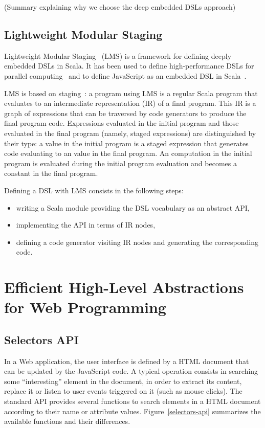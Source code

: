 \documentclass[preprint]{sigplanconf}
\begin{document}
(Summary explaining why we choose the deep embedded DSLs approach)

\subsection{Lightweight Modular Staging}

Lightweight Modular Staging~\cite{Rompf12_LMSThesis, Rompf12_LMS} (LMS) is a framework for defining
deeply embedded DSLs in Scala. It has been used to define high-performance DSLs for parallel
computing~\cite{Brown11_Parallel} and to define JavaScript as an embedded DSL in
Scala~\cite{Kossakowski12_JsDESL}.

LMS is based on staging~\cite{Jorring1986_Staging}: a program using LMS is a regular Scala program
that evaluates to an intermediate representation (IR) of a final program. This IR is a graph of
expressions that can be traversed by code generators to produce the final program code. Expressions
evaluated in the initial program and those evaluated in the final program (namely, staged
expressions) are distinguished by their type: a  value in the initial program is a
staged expression that generates code evaluating to an  value in the final program. An
 computation in the initial program is evaluated during the initial program evaluation and
becomes a constant in the final program.

Defining a DSL with LMS consists in the following steps:

\begin{itemize}
 \item writing a Scala module providing the DSL vocabulary as an abstract API,
 \item implementing the API in terms of IR nodes,
 \item defining a code generator visiting IR nodes and generating the corresponding code.
\end{itemize}

\section{Efficient High-Level Abstractions for Web Programming}
\label{contribution}

\subsection{Selectors API}

In a Web application, the user interface is defined by a HTML document that can be updated by the
JavaScript code. A typical operation consists in searching some “interesting” element in the
document, in order to extract its content, replace it or listen to user events triggered on it (such
as mouse clicks). The standard API provides several functions to search elements in a HTML document
according to their name or attribute values. Figure~\ref{selectors-api} summarizes the available
functions and their differences.
\end{document}
